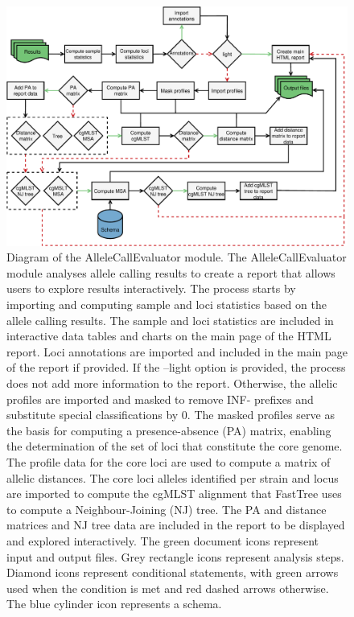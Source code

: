 \newpage
\begin{figure}[h!]
    \centering
    \includegraphics[angle=0,width=\textwidth]{figures/chapter 2/FigureS22.pdf}
    \caption{Diagram of the AlleleCallEvaluator module. The AlleleCallEvaluator module analyses allele calling results to create a report that allows users to explore results interactively. The process starts by importing and computing sample and loci statistics based on the allele calling results. The sample and loci statistics are included in interactive data tables and charts on the main page of the HTML report. Loci annotations are imported and included in the main page of the report if provided. If the --light option is provided, the process does not add more information to the report. Otherwise, the allelic profiles are imported and masked to remove INF- prefixes and substitute special classifications by 0. The masked profiles serve as the basis for computing a presence-absence (PA) matrix, enabling the determination of the set of loci that constitute the core genome. The profile data for the core loci are used to compute a matrix of allelic distances. The core loci alleles identified per strain and locus are imported to compute the cgMLST alignment that FastTree uses to compute a Neighbour-Joining (NJ) tree. The PA and distance matrices and NJ tree data are included in the report to be displayed and explored interactively. The green document icons represent input and output files. Grey rectangle icons represent analysis steps. Diamond icons represent conditional statements, with green arrows used when the condition is met and red dashed arrows otherwise. The blue cylinder icon represents a schema.}
    \label{fig:chap2_figureS22}
\end{figure}




